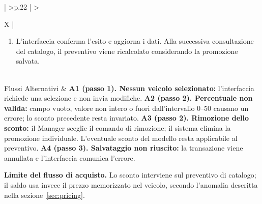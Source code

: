 \begin{xltabular}{\textwidth}{| >{\bfseries}p{.22\textwidth} | >{\raggedright\arraybackslash}X |}
\begin{enumerate}[label=\arabic*.,start=1,leftmargin=*,nosep]
  \item L'interfaccia conferma l'esito e aggiorna i dati. Alla successiva consultazione del catalogo, il preventivo viene ricalcolato considerando la promozione salvata.
\end{enumerate}\\\hline
Flussi Alternativi &
\textbf{A1 (passo 1). Nessun veicolo selezionato:} l'interfaccia richiede una selezione e non invia modifiche.\newline\newline
\textbf{A2 (passo 2). Percentuale non valida:} campo vuoto, valore non intero o fuori dall'intervallo 0--50 causano un errore; lo sconto precedente resta invariato.\newline\newline
\textbf{A3 (passo 2). Rimozione dello sconto:} il Manager sceglie il comando di rimozione; il sistema elimina la promozione individuale. L'eventuale sconto del modello resta applicabile al preventivo.\newline\newline
\textbf{A4 (passo 3). Salvataggio non riuscito:} la transazione viene annullata e l'interfaccia comunica l'errore.\\\hline
\end{xltabular}
\noindent\textbf{Limite del flusso di acquisto.} Lo sconto interviene sul preventivo di catalogo; il saldo usa invece il prezzo memorizzato nel veicolo, secondo l'anomalia descritta nella sezione~\ref{sec:pricing}.
